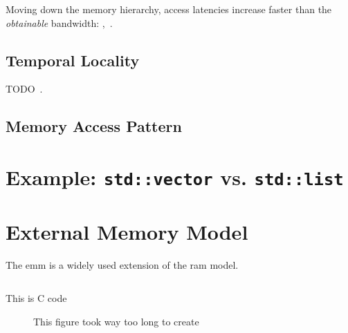 \documentclass[a4paper]{scrartcl}
\begin{document}
Moving down the memory hierarchy, access latencies increase faster than the
\emph{obtainable} bandwidth: ,~\cite[2]{afmh}.


\subsection{Temporal Locality}
TODO~\cite{drepper2007}.

\subsection{Memory Access Pattern}
\label{sec:map}

\section{Example: \texttt{std::vector} vs. \texttt{std::list}}
\label{sec:vvl}


\section{External Memory Model}
The \gls{emm} is a widely used
extension of the \gls{ram} model.

\begin{listing}
   \inputminted[firstline=8]{c}{array-sum/array-sum.c}
   \caption{This is C code}
   \label{lst:array-sum}
\end{listing}


\begin{figure}
   \centering
   \caption{This figure took way too long to create}
   \label{fig:array-sum}
\end{figure}
\end{document}
